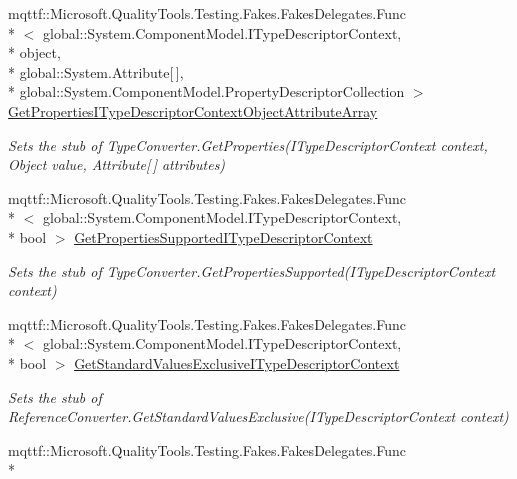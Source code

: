 \begin{DoxyCompactItemize}
mqttf\-::\-Microsoft.\-Quality\-Tools.\-Testing.\-Fakes.\-Fakes\-Delegates.\-Func\\*
$<$ global\-::\-System.\-Component\-Model.\-I\-Type\-Descriptor\-Context, \\*
object, \\*
global\-::\-System.\-Attribute\mbox{[}$\,$\mbox{]}, \\*
global\-::\-System.\-Component\-Model.\-Property\-Descriptor\-Collection $>$ \hyperlink{class_system_1_1_component_model_1_1_fakes_1_1_stub_reference_converter_ab1ee99c243a9a5e6811c47f7e5890873}{Get\-Properties\-I\-Type\-Descriptor\-Context\-Object\-Attribute\-Array}
\begin{DoxyCompactList}\small\item\em Sets the stub of Type\-Converter.\-Get\-Properties(\-I\-Type\-Descriptor\-Context context, Object value, Attribute\mbox{[}$\,$\mbox{]} attributes)\end{DoxyCompactList}\item 
mqttf\-::\-Microsoft.\-Quality\-Tools.\-Testing.\-Fakes.\-Fakes\-Delegates.\-Func\\*
$<$ global\-::\-System.\-Component\-Model.\-I\-Type\-Descriptor\-Context, \\*
bool $>$ \hyperlink{class_system_1_1_component_model_1_1_fakes_1_1_stub_reference_converter_a61eeaa3dc6b7d31efc64fc2a02c9d54a}{Get\-Properties\-Supported\-I\-Type\-Descriptor\-Context}
\begin{DoxyCompactList}\small\item\em Sets the stub of Type\-Converter.\-Get\-Properties\-Supported(\-I\-Type\-Descriptor\-Context context)\end{DoxyCompactList}\item 
mqttf\-::\-Microsoft.\-Quality\-Tools.\-Testing.\-Fakes.\-Fakes\-Delegates.\-Func\\*
$<$ global\-::\-System.\-Component\-Model.\-I\-Type\-Descriptor\-Context, \\*
bool $>$ \hyperlink{class_system_1_1_component_model_1_1_fakes_1_1_stub_reference_converter_ac9af3858fa4bf805ad1f487f2f10ed05}{Get\-Standard\-Values\-Exclusive\-I\-Type\-Descriptor\-Context}
\begin{DoxyCompactList}\small\item\em Sets the stub of Reference\-Converter.\-Get\-Standard\-Values\-Exclusive(\-I\-Type\-Descriptor\-Context context)\end{DoxyCompactList}\item 
mqttf\-::\-Microsoft.\-Quality\-Tools.\-Testing.\-Fakes.\-Fakes\-Delegates.\-Func\\*

\end{DoxyCompactItemize}
